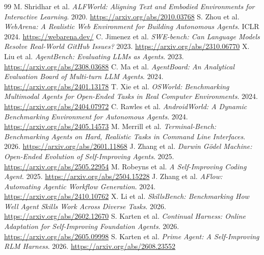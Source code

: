 \documentclass[11pt,a4paper,fontset=fandol]{ctexart}
\begin{document}
\begin{thebibliography}{99}
 M. Shridhar et al. \emph{ALFWorld: Aligning Text and Embodied Environments for Interactive Learning}. 2020. \url{https://arxiv.org/abs/2010.03768}
 S. Zhou et al. \emph{WebArena: A Realistic Web Environment for Building Autonomous Agents}. ICLR 2024. \url{https://webarena.dev/}
 C. Jimenez et al. \emph{SWE-bench: Can Language Models Resolve Real-World GitHub Issues?} 2023. \url{https://arxiv.org/abs/2310.06770}
 X. Liu et al. \emph{AgentBench: Evaluating LLMs as Agents}. 2023. \url{https://arxiv.org/abs/2308.03688}
 C. Ma et al. \emph{AgentBoard: An Analytical Evaluation Board of Multi-turn LLM Agents}. 2024. \url{https://arxiv.org/abs/2401.13178}
 T. Xie et al. \emph{OSWorld: Benchmarking Multimodal Agents for Open-Ended Tasks in Real Computer Environments}. 2024. \url{https://arxiv.org/abs/2404.07972}
 C. Rawles et al. \emph{AndroidWorld: A Dynamic Benchmarking Environment for Autonomous Agents}. 2024. \url{https://arxiv.org/abs/2405.14573}
 M. Merrill et al. \emph{Terminal-Bench: Benchmarking Agents on Hard, Realistic Tasks in Command Line Interfaces}. 2026. \url{https://arxiv.org/abs/2601.11868}
 J. Zhang et al. \emph{Darwin G\"odel Machine: Open-Ended Evolution of Self-Improving Agents}. 2025. \url{https://arxiv.org/abs/2505.22954}
 M. Robeyns et al. \emph{A Self-Improving Coding Agent}. 2025. \url{https://arxiv.org/abs/2504.15228}
 J. Zhang et al. \emph{AFlow: Automating Agentic Workflow Generation}. 2024. \url{https://arxiv.org/abs/2410.10762}
 X. Li et al. \emph{SkillsBench: Benchmarking How Well Agent Skills Work Across Diverse Tasks}. 2026. \url{https://arxiv.org/abs/2602.12670}
 S. Karten et al. \emph{Continual Harness: Online Adaptation for Self-Improving Foundation Agents}. 2026. \url{https://arxiv.org/abs/2605.09998}
 S. Karten et al. \emph{Prime Agent: A Self-Improving RLM Harness}. 2026. \url{https://arxiv.org/abs/2608.23552}
\end{thebibliography}
\end{document}
